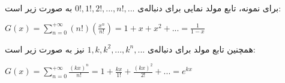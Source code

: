 
برای نمونه،
تابع مولد نمایی برای دنباله‌ی 
$0!, 1!, 2!, ..., n!, ...$ 
به صورت زیر است:
\begin{center}
    $G(x)= \sum\limits_{n=0}^{+\infty} (n!)(\frac{x^{n}}{n!}) 
    = 1 + x + x^{2} + ... = \frac{1}{1-x}$		
\end{center}

همچنین تابع مولد برای دنباله‌ی 
$1, k, k^{2}, ..., k^{n}, ...$
نیز به صورت زیر است: 
\begin{center}
    $G(x)= \sum\limits_{n=0}^{+\infty} \frac{(kx)^{n}}{n!} 
    = 1 + \frac{kx}{1!} + \frac{(kx)^{2}}{2!} + ... = e^{kx}$		
\end{center}	